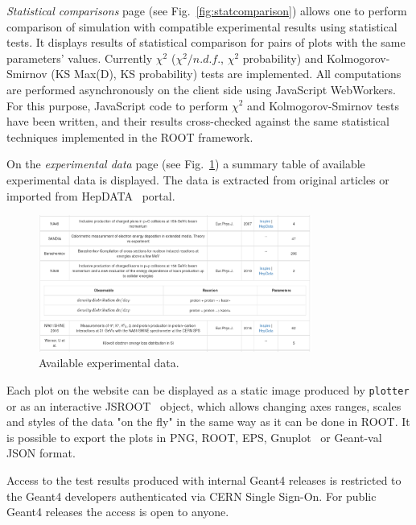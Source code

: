 \textit{Statistical comparisons} page (see Fig.~\ref{fig:statcomparison}) allows one to perform comparison of simulation with compatible experimental results using statistical tests. It displays results of statistical comparison for pairs of plots with the same parameters' values.
Currently $\chi^2$ ($\chi^2/n.d.f.$, $\chi^2$ probability) and Kolmogorov-Smirnov (KS Max(D), KS probability) tests are implemented. All computations are performed asynchronously on the client side using JavaScript WebWorkers.
For this purpose, JavaScript code to perform $\chi^2$ and Kolmogorov-Smirnov tests have been written, and their results cross-checked against the same statistical techniques implemented in the ROOT framework.


On the \textit{experimental data} page (see Fig.~\ref{fig:exppage}) a summary table of available experimental data is displayed. The data is extracted from original articles or imported from HepDATA~\cite{hepdata} portal. %

\begin{figure}[h]
    \centering
    \includegraphics[width=0.8\textwidth,clip]{expdata.png}
    \caption{Available experimental data.}
    \label{fig:exppage}
\end{figure}

Each plot on the website can be displayed as a static image produced by {\tt plotter} or as an interactive JSROOT~\cite{JSROOT} object, which allows changing axes ranges, scales and styles of the data "on the fly" in the same way as it can be done in ROOT. It is possible to export the plots in PNG, ROOT, EPS, Gnuplot~\cite{gnuplot} or \textsf{Geant-val} JSON format.

Access to the test results produced with internal Geant4 releases is restricted to the Geant4 developers authenticated via CERN Single Sign-On. For public Geant4 releases the access is open to anyone.

